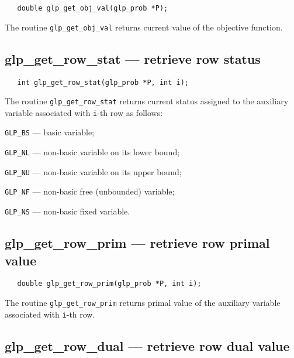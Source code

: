 \synopsis

\begin{verbatim}
   double glp_get_obj_val(glp_prob *P);
\end{verbatim}

\returns

The routine \verb|glp_get_obj_val| returns current value of the
objective function.

\subsection{glp\_get\_row\_stat --- retrieve row status}

\synopsis

\begin{verbatim}
   int glp_get_row_stat(glp_prob *P, int i);
\end{verbatim}

\returns

The routine \verb|glp_get_row_stat| returns current status assigned to
the auxiliary variable associated with \verb|i|-th row as follows:

\verb|GLP_BS| --- basic variable;

\verb|GLP_NL| --- non-basic variable on its lower bound;

\verb|GLP_NU| --- non-basic variable on its upper bound;

\verb|GLP_NF| --- non-basic free (unbounded) variable;

\verb|GLP_NS| --- non-basic fixed variable.

\newpage

\subsection{glp\_get\_row\_prim --- retrieve row primal value}

\synopsis

\begin{verbatim}
   double glp_get_row_prim(glp_prob *P, int i);
\end{verbatim}

\returns

The routine \verb|glp_get_row_prim| returns primal value of the
auxiliary variable associated with \verb|i|-th row.

\subsection{glp\_get\_row\_dual --- retrieve row dual value}

